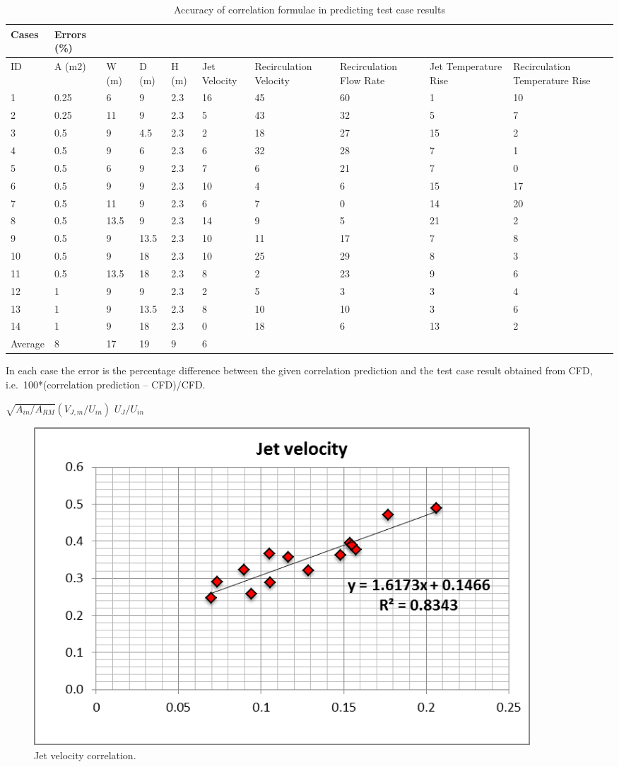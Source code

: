 \begin{longtable}[c]{p{0.5in}p{0.4in}p{0.4in}p{0.4in}p{0.4in}p{0.4in}p{0.6in}p{0.6in}p{0.6in}p{0.6in}}
\caption{Accuracy of correlation formulae in predicting test case results \protect \label{table:accuracy-of-correlation-formulae-in}}\\
\toprule 
Cases & Errors (\%) \tabularnewline \midrule
\endhead
ID & A (m2) & W (m) & D (m) & H (m) & Jet Velocity & Recirculation Velocity & Recirculation Flow Rate & Jet Temperature Rise & Recirculation Temperature Rise \tabularnewline
1 & 0.25 & 6 & 9 & 2.3 & 16 & 45 & 60 & 1 & 10 \tabularnewline
2 & 0.25 & 11 & 9 & 2.3 & 5 & 43 & 32 & 5 & 7 \tabularnewline
3 & 0.5 & 9 & 4.5 & 2.3 & 2 & 18 & 27 & 15 & 2 \tabularnewline
4 & 0.5 & 9 & 6 & 2.3 & 6 & 32 & 28 & 7 & 1 \tabularnewline
5 & 0.5 & 6 & 9 & 2.3 & 7 & 6 & 21 & 7 & 0 \tabularnewline
6 & 0.5 & 9 & 9 & 2.3 & 10 & 4 & 6 & 15 & 17 \tabularnewline
7 & 0.5 & 11 & 9 & 2.3 & 6 & 7 & 0 & 14 & 20 \tabularnewline
8 & 0.5 & 13.5 & 9 & 2.3 & 14 & 9 & 5 & 21 & 2 \tabularnewline
9 & 0.5 & 9 & 13.5 & 2.3 & 10 & 11 & 17 & 7 & 8 \tabularnewline
10 & 0.5 & 9 & 18 & 2.3 & 10 & 25 & 29 & 8 & 3 \tabularnewline
11 & 0.5 & 13.5 & 18 & 2.3 & 8 & 2 & 23 & 9 & 6 \tabularnewline
12 & 1 & 9 & 9 & 2.3 & 2 & 5 & 3 & 3 & 4 \tabularnewline
13 & 1 & 9 & 13.5 & 2.3 & 8 & 10 & 10 & 3 & 6 \tabularnewline
14 & 1 & 9 & 18 & 2.3 & 0 & 18 & 6 & 13 & 2 \tabularnewline
Average & 8 & 17 & 19 & 9 & 6 \tabularnewline
\bottomrule
\end{longtable}

In each case the error is the percentage difference between the given correlation prediction and the test case result obtained from CFD, i.e.~100*\textbar{}(correlation prediction -- CFD)/CFD\textbar{}.

\(\sqrt {{A_{in}}/{A_{RM}}} \left( {{V_{J,m}}/{U_{in}}} \right)\) \({U_J}/{U_{in}}\) 

\begin{figure}[hbtp]
\centering
\includegraphics[width=0.9\textwidth, height=0.9\textheight, keepaspectratio=true]{media/image2652.png}
\caption{Jet velocity correlation. \protect \label{fig:jet-veolicty-correlation}}
\end{figure}

